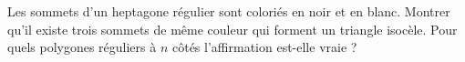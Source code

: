 Les sommets d'un heptagone régulier sont coloriés en noir et en blanc. Montrer qu'il existe trois sommets de même couleur qui forment un triangle isocèle. Pour quels polygones réguliers à $n$ côtés l'affirmation est-elle vraie ?
